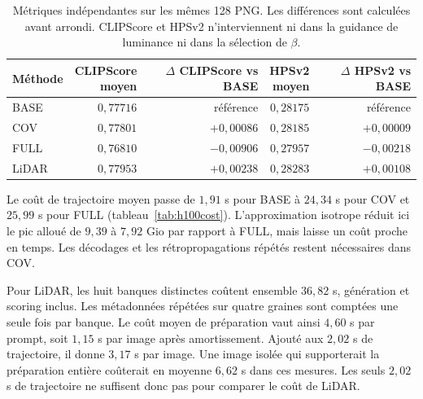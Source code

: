 \documentclass[11pt,a4paper]{article}
\begin{document}
\begin{table}[!htb]
\centering\small
\begin{tabular}{lrrrr}
\toprule
Méthode & \shortstack{CLIPScore\\moyen} & \shortstack{$\Delta$ CLIPScore\\vs BASE} & \shortstack{HPSv2\\moyen} & \shortstack{$\Delta$ HPSv2\\vs BASE}\\
\midrule
BASE & $0{,}77716$ & référence & $0{,}28175$ & référence\\
COV & $0{,}77801$ & $+0{,}00086$ & $0{,}28185$ & $+0{,}00009$\\
FULL & $0{,}76810$ & $-0{,}00906$ & $0{,}27957$ & $-0{,}00218$\\
LiDAR & $0{,}77953$ & $+0{,}00238$ & $0{,}28283$ & $+0{,}00108$\\
\bottomrule
\end{tabular}
\caption{Métriques indépendantes sur les mêmes 128 PNG. Les différences sont calculées avant arrondi. CLIPScore et HPSv2 n'interviennent ni dans la guidance de luminance ni dans la sélection de $\beta$.}
\label{tab:h100quality}
\end{table}

Le coût de trajectoire moyen passe de $1{,}91$ s pour BASE à $24{,}34$ s pour COV et $25{,}99$ s pour FULL (tableau~\ref{tab:h100cost}). L'approximation isotrope réduit ici le pic alloué de $9{,}39$ à $7{,}92$ Gio par rapport à FULL, mais laisse un coût proche en temps. Les décodages et les rétropropagations répétés restent nécessaires dans COV.

Pour LiDAR, les huit banques distinctes coûtent ensemble $36{,}82$ s, génération et scoring inclus. Les métadonnées répétées sur quatre graines sont comptées une seule fois par banque. Le coût moyen de préparation vaut ainsi $4{,}60$ s par prompt, soit $1{,}15$ s par image après amortissement. Ajouté aux $2{,}02$ s de trajectoire, il donne $3{,}17$ s par image. Une image isolée qui supporterait la préparation entière coûterait en moyenne $6{,}62$ s dans ces mesures. Les seuls $2{,}02$ s de trajectoire ne suffisent donc pas pour comparer le coût de LiDAR.
\end{document}
